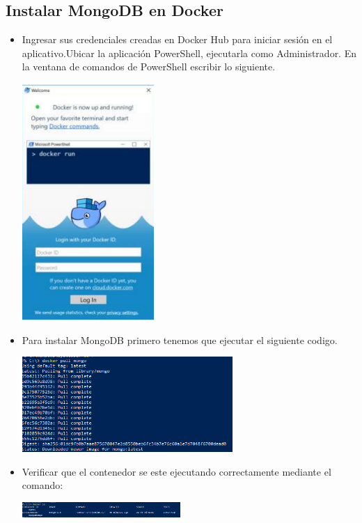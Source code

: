 \documentclass[%
 reprint,
 amsmath,amssymb,
 aps,
]{revtex4-1}
\begin{document}
\subsection{Instalar MongoDB en Docker}
     \begin{itemize}
                     \item Ingresar sus credenciales creadas en Docker Hub para iniciar sesión en el aplicativo.Ubicar la aplicación PowerShell, ejecutarla como Administrador. En la ventana de comandos de PowerShell escribir lo siguiente.
                     \begin{center}
		\includegraphics[width=5cm]{./Imagenes/8}
		\end{center}	
		\item Para instalar MongoDB primero tenemos que ejecutar el siguiente codigo.
                     \begin{center}
		\includegraphics[width=8cm]{./Imagenes/14}
		\end{center}	
		\item Verificar que el contenedor se este ejecutando correctamente mediante el comando:
                     \begin{center}
		\includegraphics[width=6cm]{./Imagenes/9}

\end{center}
\end{itemize}
\end{document}
